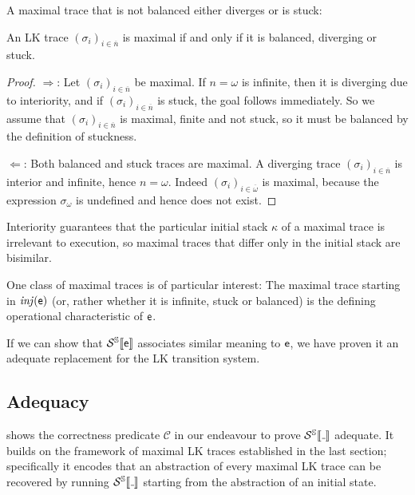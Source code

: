 A maximal trace that is not balanced either diverges or is stuck:

\begin{lemma}
  An LK trace $(σ_i)_{i∈\overline{n}}$ is maximal if and only if it is balanced,
  diverging or stuck.
\end{lemma}
\begin{proof}
  $\Rightarrow$: Let $(σ_i)_{i∈\overline{n}}$ be maximal.
  If $n=ω$ is infinite, then it is diverging due to interiority, and if
  $(σ_i)_{i∈\overline{n}}$ is stuck, the goal follows immediately.
  So we assume that $(σ_i)_{i∈\overline{n}}$ is maximal, finite and not stuck,
  so it must be balanced by the definition of stuckness.

  $\Leftarrow$: Both balanced and stuck traces are maximal.
  A diverging trace $(σ_i)_{i∈\overline{n}}$ is interior and infinite,
  hence $n=ω$.
  Indeed $(σ_i)_{i∈\overline{ω}}$ is maximal, because the expression $σ_ω$
  is undefined and hence does not exist.
\end{proof}

Interiority guarantees that the particular initial stack $κ$ of a maximal trace
is irrelevant to execution, so maximal traces that differ only in the initial
stack are bisimilar.

One class of maximal traces is of particular interest:
The maximal trace starting in $\mathit{inj}(\mathsf{e})$ (or, rather whether it is infinite,
stuck or balanced) is the defining operational characteristic of $\mathsf{e}$.

If we can show that $\mathcal{S}^{\mathbb{S}}\llbracket {\mathsf{e}} \rrbracket$ associates similar meaning to $\mathsf{e}$, we have
proven it an adequate replacement for the LK transition system.

\subsection{Adequacy}

 shows the correctness predicate $\mathcal{C}$ in
our endeavour to prove $\semst{\wild}$ adequate.
It builds on the framework of maximal LK traces established in the last section;
specifically it encodes that an abstraction of every maximal LK trace can be
recovered by running $\semst{\wild}$ starting from the abstraction of an initial
state.

